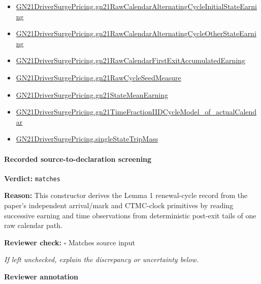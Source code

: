 \documentclass[10pt]{article}
\newcommand{\reviewerbox}{%
  \par\noindent\fbox{\parbox{0.96\linewidth}{\rule{0pt}{0.38in}}}\par
}
\newcommand{\reviewmatch}[1]{%
  \par\noindent\textbf{Reviewer check:} $\square$\; #1\par
  \noindent\emph{If left unchecked, explain the discrepancy or uncertainty below.}\par
}
\begin{document}
\begin{itemize}
\item \hyperlink{governing-declaration-70ba48e9ff578bf6}{GN21\allowbreak{}Driver\allowbreak{}Surge\allowbreak{}Pricing.\allowbreak{}gn21\allowbreak{}Raw\allowbreak{}Calendar\allowbreak{}Alternating\allowbreak{}Cycle\allowbreak{}Initial\allowbreak{}State\allowbreak{}Earning}
\item \hyperlink{governing-declaration-e6e2b7a54354ab29}{GN21\allowbreak{}Driver\allowbreak{}Surge\allowbreak{}Pricing.\allowbreak{}gn21\allowbreak{}Raw\allowbreak{}Calendar\allowbreak{}Alternating\allowbreak{}Cycle\allowbreak{}Other\allowbreak{}State\allowbreak{}Earning}
\item \hyperlink{governing-declaration-af7079bc0e3f7851}{GN21\allowbreak{}Driver\allowbreak{}Surge\allowbreak{}Pricing.\allowbreak{}gn21\allowbreak{}Raw\allowbreak{}Calendar\allowbreak{}First\allowbreak{}Exit\allowbreak{}Accumulated\allowbreak{}Earning}
\item \hyperlink{governing-declaration-c0f7bde0d191339c}{GN21\allowbreak{}Driver\allowbreak{}Surge\allowbreak{}Pricing.\allowbreak{}gn21\allowbreak{}Raw\allowbreak{}Cycle\allowbreak{}Seed\allowbreak{}Measure}
\item \hyperlink{governing-declaration-3a25a0c77bd5a518}{GN21\allowbreak{}Driver\allowbreak{}Surge\allowbreak{}Pricing.\allowbreak{}gn21\allowbreak{}State\allowbreak{}Mean\allowbreak{}Earning}
\item \hyperlink{paper-prerequisite-a6cc9c4b5d87298b}{GN21\allowbreak{}Driver\allowbreak{}Surge\allowbreak{}Pricing.\allowbreak{}gn21\allowbreak{}Time\allowbreak{}Fraction\allowbreak{}IID\allowbreak{}Cycle\allowbreak{}Model\_\allowbreak{}of\_\allowbreak{}actual\allowbreak{}Calendar}
\item \hyperlink{governing-declaration-1c88cf5996e161d3}{GN21\allowbreak{}Driver\allowbreak{}Surge\allowbreak{}Pricing.\allowbreak{}single\allowbreak{}State\allowbreak{}Trip\allowbreak{}Mass}
\end{itemize}
\paragraph{Recorded source-to-declaration screening}
\textbf{Verdict:} \texttt{matches}
\\
{\raggedright
\textbf{Reason:} This constructor derives the Lemma 1 renewal-\allowbreak{}cycle record from the paper's independent arrival/\allowbreak{}mark and CTMC-\allowbreak{}clock primitives by reading successive earning and time observations from deterministic post-\allowbreak{}exit tails of one raw calendar path.\allowbreak{}
\par}
\reviewmatch{Matches source input}
\noindent\textbf{Reviewer annotation}\par
\reviewerbox
\clearpage
\hypertarget{paper-prerequisite-28a97f81b0e6d592}{}
\end{document}
